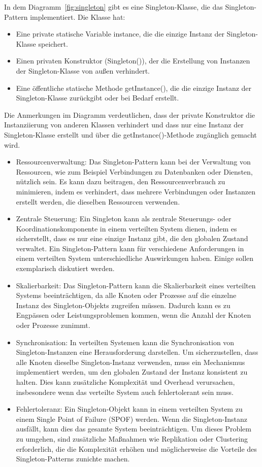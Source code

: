 \documentclass[../vs-script-first-v01.tex]{subfiles}
\begin{document}
In dem Diagramm~\ref{fig:singleton} gibt es eine Singleton-Klasse, die das Singleton-Pattern implementiert. Die Klasse hat:
\begin{itemize}
\item Eine private statische Variable instance, die die einzige Instanz der Singleton-Klasse speichert.
\item Einen privaten Konstruktor (Singleton()), der die Erstellung von Instanzen der Singleton-Klasse von außen verhindert.
\item Eine öffentliche statische Methode getInstance(), die die einzige Instanz der Singleton-Klasse zurückgibt oder bei Bedarf erstellt.
\end{itemize}
Die Anmerkungen im Diagramm verdeutlichen, dass der private Konstruktor die Instanziierung von anderen Klassen verhindert und dass nur eine Instanz der Singleton-Klasse erstellt und über die getInstance()-Methode zugänglich gemacht wird.
\begin{itemize}
\item Ressourcenverwaltung: Das Singleton-Pattern kann bei der Verwaltung von Ressourcen, wie zum Beispiel Verbindungen zu Datenbanken oder Diensten, nützlich sein. Es kann dazu beitragen, den Ressourcenverbrauch zu minimieren, indem es verhindert, dass mehrere Verbindungen oder Instanzen erstellt werden, die dieselben Ressourcen verwenden.
\item Zentrale Steuerung: Ein Singleton kann als zentrale Steuerungs- oder Koordinationskomponente in einem verteilten System dienen, indem es sicherstellt, dass es nur eine einzige Instanz gibt, die den globalen Zustand verwaltet. Ein Singleton-Pattern kann für verschiedene Anforderungen in einem verteilten System unterschiedliche Auswirkungen haben. Einige sollen exemplarisch diskutiert werden.
\end{itemize}
\begin{itemize}
\item Skalierbarkeit: Das Singleton-Pattern kann die Skalierbarkeit eines verteilten Systems beeinträchtigen, da alle Knoten oder Prozesse auf die einzelne Instanz des Singleton-Objekts zugreifen müssen. Dadurch kann es zu Engpässen oder Leistungsproblemen kommen, wenn die Anzahl der Knoten oder Prozesse zunimmt.
\item Synchronisation: In verteilten Systemen kann die Synchronisation von Singleton-Instanzen eine Herausforderung darstellen. Um sicherzustellen, dass alle Knoten dieselbe Singleton-Instanz verwenden, muss ein Mechanismus implementiert werden, um den globalen Zustand der Instanz konsistent zu halten. Dies kann zusätzliche Komplexität und Overhead verursachen, insbesondere wenn das verteilte System auch fehlertolerant sein muss.
\item Fehlertoleranz: Ein Singleton-Objekt kann in einem verteilten System zu einem Single Point of Failure (SPOF) werden. Wenn die Singleton-Instanz ausfällt, kann dies das gesamte System beeinträchtigen. Um dieses Problem zu umgehen, sind zusätzliche Maßnahmen wie Replikation oder Clustering erforderlich, die die Komplexität erhöhen und möglicherweise die Vorteile des Singleton-Patterns zunichte machen.
\end{itemize}
\end{document}
